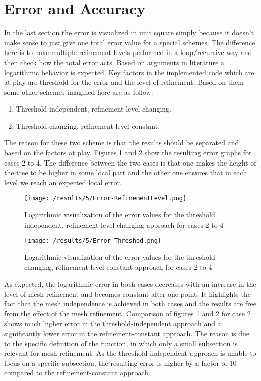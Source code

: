 \section{Error and Accuracy}
In the last section the error is visualized in unit square simply because it doesn't make sense to just give one total error value for a special schemes. The difference here is to have multiple refinement levels performed in a loop/recursive way and then check how the total error acts. Based on arguments in literature a logarithmic behavior is expected. Key factors in the implemented code which are at play are threshold for the error and the level of refinement. Based on them some other schemes imagined here are as follow:
\begin{enumerate}
\item Threshold independent, refinement level changing.
\item Threshold changing, refinement level constant.
\end{enumerate}
The reason for these two scheme is that the results should be separated and based on the factors at play. Figures \ref{fig:ErrorRefinementLevel} and \ref{fig:ErrorThreshod} show the resulting error graphs for cases 2 to 4. The difference between the two cases is that one makes the height of the tree to be higher in some local part and the other one ensures that in each level we reach an expected local error. 


\begin{figure}[h]
	\centering
	    \texttt{[image: /results/5/Error-RefinementLevel.png]}
		\centering    
	 \caption{Logarithmic visualization of the error values for the threshold independent, refinement level changing approach for cases 2 to 4}
       \label{fig:ErrorRefinementLevel}
\end{figure}

\begin{figure}[h]
	\centering
	    \texttt{[image: /results/5/Error-Threshod.png]}
		\centering    
	 \caption{Logarithmic visualization of the error values for the threshold changing, refinement level constant approach for cases 2 to 4}
       \label{fig:ErrorThreshod}
\end{figure}

As expected, the logarithmic error in both cases decreases with an increase in the level of mesh refinement and becomes constant after one point. It highlights the fact that the mesh independence is achieved in both cases and the results are free from the effect of the mesh refinement. Comparison of figures \ref{fig:ErrorRefinementLevel} and \ref{fig:ErrorThreshod} for case 2 shows much higher error in the threshold-independent approach and a significantly lower error in the refinement-constant approach. The reason is due to the specific definition of the function, in which only a small subsection is relevant for mesh-refinement. As the threshold-independent approach is unable to focus on a specific subsection, the resulting error is higher by a factor of 10 compared to the refinement-constant approach.





